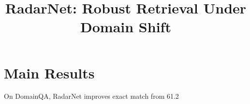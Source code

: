\documentclass{article}
\title{RadarNet: Robust Retrieval Under Domain Shift}
\begin{document}
\maketitle

\section{Main Results}
On DomainQA, RadarNet improves exact match from 61.2%
\end{document}
